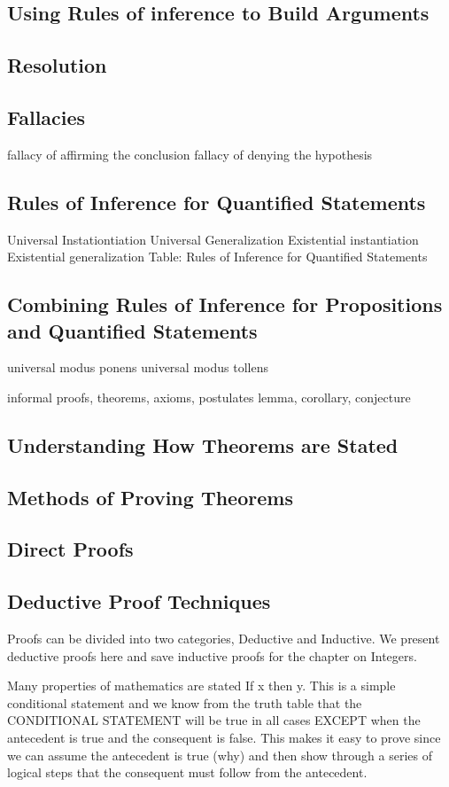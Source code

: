 \documentclass[11pt]{book} %
\theoremstyle {definition}
\theoremstyle {remark}
\begin{document}
  \subsection {Using Rules of inference to Build Arguments}
  \subsection {Resolution}
  \subsection {Fallacies}
fallacy of affirming the conclusion
fallacy of denying the hypothesis
  \subsection {Rules of Inference for Quantified Statements}
Universal Instationtiation
Universal Generalization
Existential instantiation
Existential generalization
Table: Rules of Inference for Quantified Statements
  \subsection {Combining Rules of Inference for Propositions and Quantified Statements}
universal modus ponens
universal modus tollens




informal proofs, theorems, axioms, postulates
lemma, corollary, conjecture 
    \subsection {Understanding How Theorems are Stated}
    \subsection {Methods of Proving Theorems}
    \subsection {Direct Proofs}
    \subsection {Deductive Proof Techniques}
Proofs can be divided into two categories, Deductive and Inductive. We present deductive proofs here and save inductive proofs for the chapter on Integers.

Many properties of mathematics are stated If x then y. This is a simple conditional statement and we know from the truth table that the CONDITIONAL STATEMENT will be true in all cases EXCEPT when the antecedent is true and the consequent is false. This makes it easy to prove since we can assume the antecedent is true (why) and then show through a series of logical steps that the consequent must follow from the antecedent. 
\end{document}
